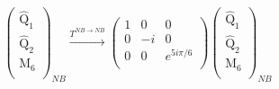 \documentclass[12pt,a4paper]{article}
\newcounter{arrow}
\begin{document}
\begin{align}
\left( \begin{matrix}
\widehat{\text{Q}}_1\\
\widehat{\text{Q}}_2\\
\text{M}_6\\
\end{matrix} \right)_{NB} \xrightarrow{T^{NB \rightarrow NB}}
\left( \begin{matrix}
1 & 0 & 0\\
0 & -i & 0 \\
0 & 0& e^{5i \pi /6} \\
\end{matrix} \right)
\left( \begin{matrix}
\widehat{\text{Q}}_1\\
\widehat{\text{Q}}_2\\
\text{M}_6\\
\end{matrix} \right)_{NB}
\end{align}
\end{document}
